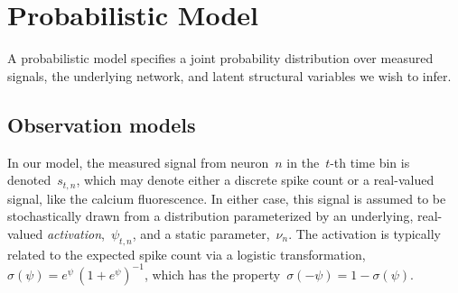 


\section{Probabilistic Model}


A probabilistic model specifies a joint probability distribution over
measured signals, the underlying network, and latent structural
variables we wish to infer.  

\subsection{Observation models}
In our model, the measured signal from
neuron~$n$ in the~$t$-th time bin is denoted~$s_{t,n}$, which may 
denote either a discrete spike count or a real-valued signal, like 
the calcium fluorescence. In either case, this signal is assumed 
to be stochastically drawn from a distribution parameterized by 
an underlying, real-valued \emph{activation},~$\psi_{t,n}$,
and a static parameter,~$\nu_n$. The
activation is typically related to the expected spike count via
a logistic transformation,~$\sigma(\psi) = e^\psi \, (1+e^\psi)^{-1}$,
which has the property~$\sigma(-\psi) = 1-\sigma(\psi)$.


